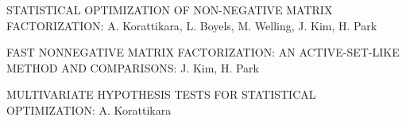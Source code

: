 \begin{thebibliography}{100}

 STATISTICAL OPTIMIZATION OF NON-NEGATIVE MATRIX FACTORIZATION: A. Korattikara, L. Boyels, M. Welling, J. Kim, H. Park

 FAST NONNEGATIVE MATRIX FACTORIZATION: AN
ACTIVE-SET-LIKE METHOD AND COMPARISONS: J. Kim, H. Park

 MULTIVARIATE HYPOTHESIS TESTS FOR STATISTICAL OPTIMIZATION:  A. Korattikara



\end{thebibliography} 